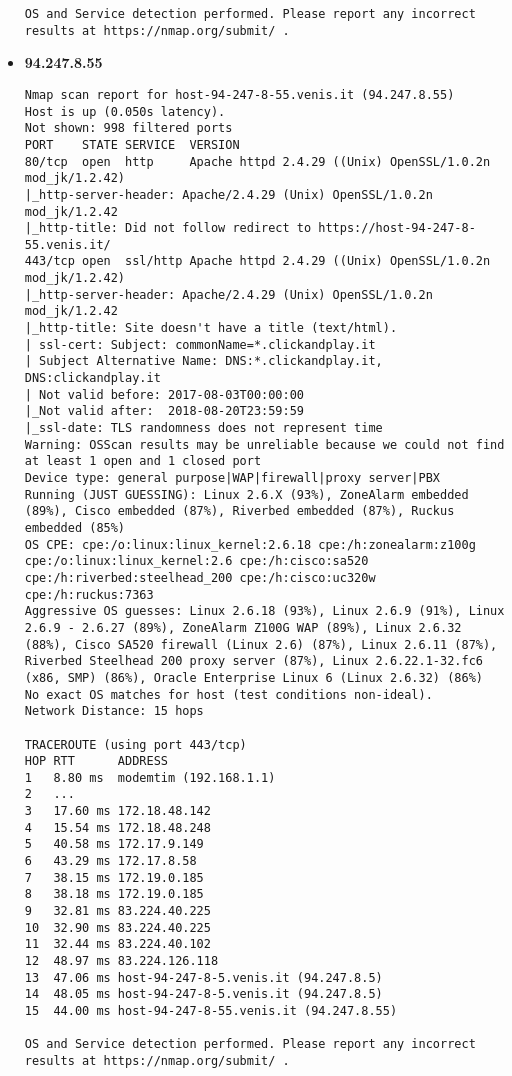 \begin{itemize}
\begin{verbatim}
OS and Service detection performed. Please report any incorrect results at https://nmap.org/submit/ .
\end{verbatim}

      \item \textbf{94.247.8.55}
\begin{verbatim}
Nmap scan report for host-94-247-8-55.venis.it (94.247.8.55)
Host is up (0.050s latency).
Not shown: 998 filtered ports
PORT    STATE SERVICE  VERSION
80/tcp  open  http     Apache httpd 2.4.29 ((Unix) OpenSSL/1.0.2n mod_jk/1.2.42)
|_http-server-header: Apache/2.4.29 (Unix) OpenSSL/1.0.2n mod_jk/1.2.42
|_http-title: Did not follow redirect to https://host-94-247-8-55.venis.it/
443/tcp open  ssl/http Apache httpd 2.4.29 ((Unix) OpenSSL/1.0.2n mod_jk/1.2.42)
|_http-server-header: Apache/2.4.29 (Unix) OpenSSL/1.0.2n mod_jk/1.2.42
|_http-title: Site doesn't have a title (text/html).
| ssl-cert: Subject: commonName=*.clickandplay.it
| Subject Alternative Name: DNS:*.clickandplay.it, DNS:clickandplay.it
| Not valid before: 2017-08-03T00:00:00
|_Not valid after:  2018-08-20T23:59:59
|_ssl-date: TLS randomness does not represent time
Warning: OSScan results may be unreliable because we could not find at least 1 open and 1 closed port
Device type: general purpose|WAP|firewall|proxy server|PBX
Running (JUST GUESSING): Linux 2.6.X (93%), ZoneAlarm embedded (89%), Cisco embedded (87%), Riverbed embedded (87%), Ruckus embedded (85%)
OS CPE: cpe:/o:linux:linux_kernel:2.6.18 cpe:/h:zonealarm:z100g cpe:/o:linux:linux_kernel:2.6 cpe:/h:cisco:sa520 cpe:/h:riverbed:steelhead_200 cpe:/h:cisco:uc320w cpe:/h:ruckus:7363
Aggressive OS guesses: Linux 2.6.18 (93%), Linux 2.6.9 (91%), Linux 2.6.9 - 2.6.27 (89%), ZoneAlarm Z100G WAP (89%), Linux 2.6.32 (88%), Cisco SA520 firewall (Linux 2.6) (87%), Linux 2.6.11 (87%), Riverbed Steelhead 200 proxy server (87%), Linux 2.6.22.1-32.fc6 (x86, SMP) (86%), Oracle Enterprise Linux 6 (Linux 2.6.32) (86%)
No exact OS matches for host (test conditions non-ideal).
Network Distance: 15 hops

TRACEROUTE (using port 443/tcp)
HOP RTT      ADDRESS
1   8.80 ms  modemtim (192.168.1.1)
2   ...
3   17.60 ms 172.18.48.142
4   15.54 ms 172.18.48.248
5   40.58 ms 172.17.9.149
6   43.29 ms 172.17.8.58
7   38.15 ms 172.19.0.185
8   38.18 ms 172.19.0.185
9   32.81 ms 83.224.40.225
10  32.90 ms 83.224.40.225
11  32.44 ms 83.224.40.102
12  48.97 ms 83.224.126.118
13  47.06 ms host-94-247-8-5.venis.it (94.247.8.5)
14  48.05 ms host-94-247-8-5.venis.it (94.247.8.5)
15  44.00 ms host-94-247-8-55.venis.it (94.247.8.55)

OS and Service detection performed. Please report any incorrect results at https://nmap.org/submit/ .
\end{verbatim}

    \end{itemize}

